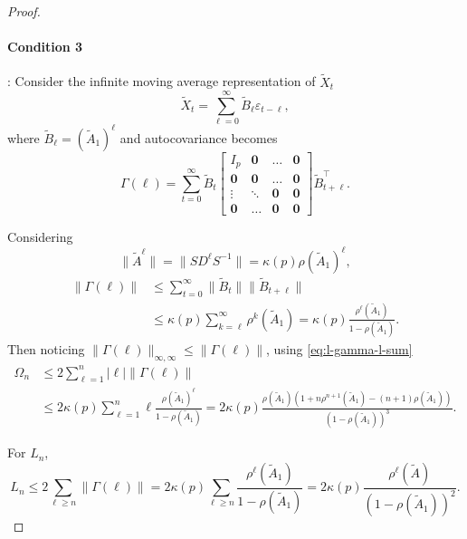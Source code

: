 \begin{proof}
\paragraph{Condition 3}: Consider the infinite moving average representation of $\tilde{X}_t$ 
\begin{equation}
\tilde{X}_t = \sum_{\ell=0}^\infty \tilde{B}_\ell \varepsilon_{t-\ell}, 
\end{equation}
where $\tilde{B}_\ell = (\tilde{A}_1)^\ell$ and autocovariance becomes
\begin{equation}
\Gamma(\ell) = \sum_{t=0}^\infty \tilde{B}_{t} \begin{bmatrix}
I_{p} & \mathbf{0} &\ldots & \mathbf{0} \\
\mathbf{0} &  \mathbf{0} & \ldots & \mathbf{0} \\
\vdots  & \ddots  &  \mathbf{0} & \mathbf{0} \\
\mathbf{0} &\ldots   &  \mathbf{0} & \mathbf{0}
\end{bmatrix}
\tilde{B}_{t+\ell}^\top. 
\end{equation}

Considering 
\begin{equation}
\|\tilde{A}^\ell\| = \|SD^\ell S^{-1}\| = \kappa(p)\rho(\tilde{A}_1)^\ell, 
\end{equation}
\begin{equation}
\label{eq:}
\begin{aligned}
\|\Gamma(\ell)\| &\le  \sum_{t=0}^\infty  \|\tilde{B}_{t}\|\|\tilde{B}_{t+\ell}\|\\
&\le \kappa(p) \sum_{k=\ell}^{\infty} \rho^k(\tilde{A}_1) = \kappa(p)\frac{\rho^\ell(\tilde{A}_1)}{1-\rho(\tilde{A}_1)}.
\end{aligned}
\end{equation}
Then noticing $\|\Gamma(\ell)\|_{\infty,\infty}\le \|\Gamma(\ell)\|$, using \eqref{eq:l-gamma-l-sum}
\begin{equation}
\begin{aligned}
\Omega_n &\le 2\sum_{\ell=1}^n |\ell|\|\Gamma(\ell)\| \\
&\le 2\kappa(p) \sum_{\ell=1}^n \ell \frac{\rho(\tilde{A}_1)^\ell}{1-\rho(\tilde{A}_1)} = 2\kappa(p)\frac{\rho(\tilde{A}_1)(1+n\rho^{n+1}(\tilde{A}_1)-(n+1)\rho(\tilde{A}_1))}{(1-\rho(\tilde{A}_1))^3}.
\end{aligned}
\end{equation}

For $L_n$, 
\begin{equation}
L_n \le 2\sum_{\ell\ge n} \|\Gamma(\ell)\| = 2\kappa(p)\sum_{\ell \ge n}\frac{\rho^\ell(\tilde{A}_1)}{1-\rho(\tilde{A}_1)} = 2\kappa(p)\frac{\rho^{\ell}(\tilde{A})}{(1-\rho(\tilde{A}_1))^2}.
\end{equation}
\end{proof}




